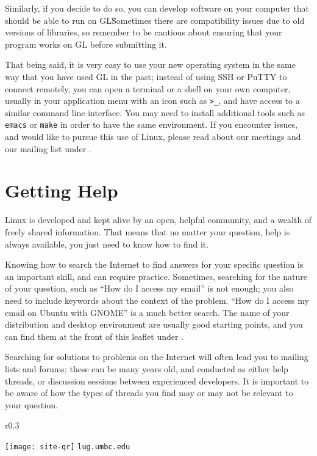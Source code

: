 \documentclass[11pt,notumble]{leaflet}
\begin{document}
Similarly, if you decide to do so, you can develop software on your computer
that should be able to run on GL\. Sometimes there are compatibility issues due
to old versions of libraries, so remember to be cautious about ensuring that
your program works on GL before submitting it.

That being said, it is very easy to use your new operating system in the same
way that you have used GL in the past; instead of using SSH or PuTTY to connect
remotely, you can open a terminal or a shell on your own computer, usually in
your application menu with an icon such as \verb+>_+, and have access to a
similar command line interface. You may need to install additional tools such as
\texttt{emacs} or \texttt{make} in order to have the same environment. If you
encounter issues, and would like to pursue this use of Linux, please read about
our meetings and our mailing list under .

\section{Getting Help}
\label{section:getting-help}

Linux is developed and kept alive by an open, helpful community, and a wealth of
freely shared information. That means that no matter your question, help is
always available, you just need to know how to find it.

Knowing how to search the Internet to find answers for your specific question is
an important skill, and can require practice. Sometimes, searching for the
nature of your question, such as ``How do I access my email'' is not enough; you
also need to include keywords about the context of the problem. ``How do I
access my email on Ubuntu with GNOME'' is a much better search. The name of your
distribution and desktop environment are usually good starting points, and you
can find them at the front of this leaflet under .

Searching for solutions to problems on the Internet will often lead you to
mailing lists and forums; these can be many years old, and conducted as either
help threads, or discussion sessions between experienced developers. It is
important to be aware of how the types of threads you find may or may not be
relevant to your question.

\begin{wrapfigure}{r}{0.3\textwidth}
    \vspace{-3em}
    \begin{center}
        \texttt{[image: site-qr]}
        \vspace{-2em}
        \texttt{lug.umbc.edu}
    \end{center}
\end{wrapfigure}
\end{document}
